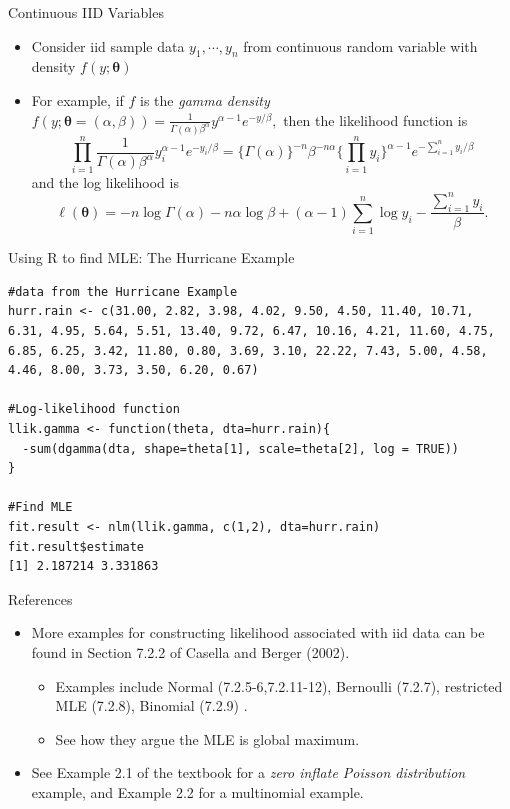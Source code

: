 \documentclass{beamer}
\begin{document}
    \begin{frame}{Continuous IID Variables}
        \begin{itemize}
            \item  Consider iid sample data $y_{1}, \cdots, y_{n}$ from continuous random variable with density $f(y;\boldsymbol{\theta})$ 
            \item For example, if $f$ is the {\it gamma density} $f(y;\boldsymbol{\theta} = (\alpha, \beta)) = \frac{1}{\Gamma(\alpha)\beta^{\alpha}}y^{\alpha - 1}e^{-y/\beta},$ then the likelihood function is
            $$\prod^{n}_{i=1}\frac{1}{\Gamma(\alpha)\beta^{\alpha}}y^{\alpha - 1}_{i}e^{-y_{i}/\beta} = \{\Gamma(\alpha)\}^{-n}\beta^{-n\alpha}\{\prod^{n}_{i=1} y_{i}\}^{\alpha - 1} e^{-\sum^{n}_{i=1} y_{i}/\beta}$$ 
            and the log likelihood is 
            $$\ell(\boldsymbol{\theta}) = -n\log \Gamma(\alpha) - n\alpha\log \beta + (\alpha - 1) \sum^{n}_{i=1} \log y_{i} - \frac{\sum^{n}_{i=1} y_{i}}{\beta}.$$
        \end{itemize}
    \end{frame}
    
    \begin{frame}[fragile]{Using R to find MLE: The Hurricane Example}

\begin{lstlisting}
#data from the Hurricane Example
hurr.rain <- c(31.00, 2.82, 3.98, 4.02, 9.50, 4.50, 11.40, 10.71, 6.31, 4.95, 5.64, 5.51, 13.40, 9.72, 6.47, 10.16, 4.21, 11.60, 4.75, 6.85, 6.25, 3.42, 11.80, 0.80, 3.69, 3.10, 22.22, 7.43, 5.00, 4.58, 4.46, 8.00, 3.73, 3.50, 6.20, 0.67)
                
#Log-likelihood function
llik.gamma <- function(theta, dta=hurr.rain){
  -sum(dgamma(dta, shape=theta[1], scale=theta[2], log = TRUE))
}

#Find MLE
fit.result <- nlm(llik.gamma, c(1,2), dta=hurr.rain)
fit.result$estimate
[1] 2.187214 3.331863

\end{lstlisting}
\end{frame}

    
\begin{frame}{References}
        \begin{itemize}
                \item  More examples for constructing likelihood associated with iid data can be found in Section 7.2.2 of Casella and Berger (2002). 
                \begin{itemize}
                    \item Examples include Normal (7.2.5-6,7.2.11-12), Bernoulli (7.2.7), restricted MLE (7.2.8), Binomial (7.2.9) .
                    \item See how they argue the MLE is global maximum.
                \end{itemize}
               \item See Example 2.1 of the textbook for a {\it zero inflate Poisson distribution} example, and Example  2.2 for a multinomial example.
          \end{itemize}
    \end{frame}
    
\end{document}
